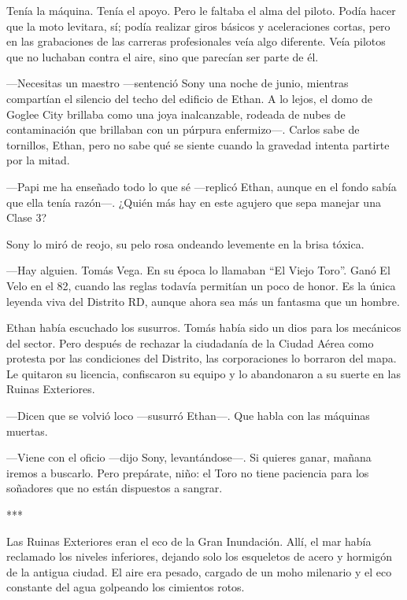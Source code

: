 \documentclass[11pt,twoside]{book}
\begin{document}
Tenía la máquina. Tenía el apoyo. Pero le faltaba el alma del piloto. Podía hacer que la moto levitara, sí; podía realizar giros básicos y aceleraciones cortas, pero en las grabaciones de las carreras profesionales veía algo diferente. Veía pilotos que no luchaban contra el aire, sino que parecían ser parte de él.

---Necesitas un maestro ---sentenció Sony una noche de junio, mientras compartían el silencio del techo del edificio de Ethan. A lo lejos, el domo de Goglee City brillaba como una joya inalcanzable, rodeada de nubes de contaminación que brillaban con un púrpura enfermizo---. Carlos sabe de tornillos, Ethan, pero no sabe qué se siente cuando la gravedad intenta partirte por la mitad.

---Papi me ha enseñado todo lo que sé ---replicó Ethan, aunque en el fondo sabía que ella tenía razón---. ¿Quién más hay en este agujero que sepa manejar una Clase 3?

Sony lo miró de reojo, su pelo rosa ondeando levemente en la brisa tóxica.

---Hay alguien. Tomás Vega. En su época lo llamaban ``El Viejo Toro''. Ganó El Velo en el 82, cuando las reglas todavía permitían un poco de honor. Es la única leyenda viva del Distrito RD, aunque ahora sea más un fantasma que un hombre.

Ethan había escuchado los susurros. Tomás había sido un dios para los mecánicos del sector. Pero después de rechazar la ciudadanía de la Ciudad Aérea como protesta por las condiciones del Distrito, las corporaciones lo borraron del mapa. Le quitaron su licencia, confiscaron su equipo y lo abandonaron a su suerte en las Ruinas Exteriores.

---Dicen que se volvió loco ---susurró Ethan---. Que habla con las máquinas muertas.

---Viene con el oficio ---dijo Sony, levantándose---. Si quieres ganar, mañana iremos a buscarlo. Pero prepárate, niño: el Toro no tiene paciencia para los soñadores que no están dispuestos a sangrar.

\bigskip
\begin{center}***\end{center}
\bigskip

Las Ruinas Exteriores eran el eco de la Gran Inundación. Allí, el mar había reclamado los niveles inferiores, dejando solo los esqueletos de acero y hormigón de la antigua ciudad. El aire era pesado, cargado de un moho milenario y el eco constante del agua golpeando los cimientos rotos.
\end{document}
